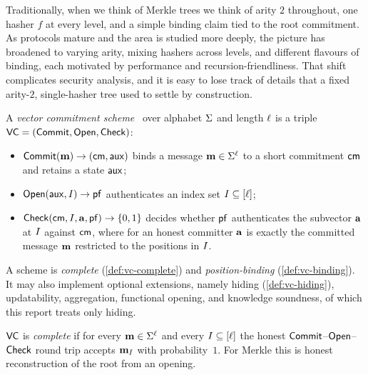 \label{sec:background}

Traditionally, when we think of Merkle trees we think of arity $2$ throughout, one hasher
$f$ at every level, and a simple binding claim tied to the root commitment.  As protocols
mature and the area is studied more deeply, the picture has broadened to varying arity,
mixing hashers across levels, and different flavours of binding, each motivated by
performance and recursion-friendliness. That shift complicates security analysis, and it
is easy to lose track of details that a fixed arity-$2$, single-hasher tree used to
settle by construction.

\begin{definition}\label{def:vcgeneral}
A \emph{vector commitment scheme}~\cite{CF13} over alphabet $\Sigma$ and length
$\ell$ is a triple $\mathsf{VC}=(\mathsf{Commit},\mathsf{Open},\mathsf{Check})$:
\begin{itemize}
  \item $\mathsf{Commit}(\mathbf{m})\to(\mathsf{cm},\mathsf{aux})$ binds a message
  $\mathbf{m}\in\Sigma^{\ell}$ to a short commitment $\mathsf{cm}$ and
  retains a state $\mathsf{aux}$;
  \item $\mathsf{Open}(\mathsf{aux},I)\to\mathsf{pf}$ authenticates an index set
  $I\subseteq[\ell]$;
  \item $\mathsf{Check}(\mathsf{cm},I,\mathbf{a},\mathsf{pf})\to\{0,1\}$ decides
  whether $\mathsf{pf}$ authenticates the subvector $\mathbf{a}$ at
  $I$ against $\mathsf{cm}$, where for an honest committer
  $\mathbf{a}$ is exactly the committed message $\mathbf{m}$ restricted
  to the positions in $I$.
\end{itemize}
A scheme is \emph{complete} (\cref{def:vc-complete}) and \emph{position-binding}
(\cref{def:vc-binding}).  It may also implement optional extensions, namely hiding
(\cref{def:vc-hiding}), updatability, aggregation, functional opening, and
knowledge soundness, of which this report treats only hiding.
\end{definition}

\begin{definition}[Completeness]\label{def:vc-complete}
$\mathsf{VC}$ is \emph{complete} if for every $\mathbf{m}\in\Sigma^{\ell}$
and every $I\subseteq[\ell]$ the honest
$\mathsf{Commit}$--$\mathsf{Open}$--$\mathsf{Check}$ round trip accepts $\mathbf{m}_{I}$ with
probability~$1$.  For Merkle this is honest reconstruction of the root from an
opening.
\end{definition}

